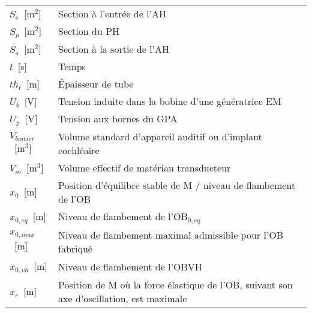 \begin{table}
{\begin{tabular}{l m{12cm}}
$S_e$~[m$^2$]       & Section à l'entrée de l'AH \\ 
$S_p$~[m$^2$]       & Section du PH \\ 
$S_s$~[m$^2$]       & Section à la sortie de l'AH \\  \cline{1-1} 
$t$~[s]            & Temps   \\
$th_t$~[m]      & Épaisseur de tube \\  \cline{1-1}
$U_b$~[V]            & Tension induite dans la bobine d'une génératrice EM     \\
$U_p$~[V]      & Tension aux bornes du GPA \\  \cline{1-1}
$V_{boitier}$~[m$^3$]   & Volume standard d'appareil auditif ou d'implant cochléaire\\
$V_m$~[m$^3$]      & Volume effectif de matériau transducteur   \\  \cline{1-1}
$x_0$~[m]            & Position d'équilibre stable de M / niveau de flambement de l'OB \\
$x_{0,eq}$~[m]       & Niveau de flambement de l'OB$_{0,eq}$                     \\
$x_{0,max}$~[m]      & Niveau de flambement maximal admissible pour l'OB fabriqué \\
$x_{0,vh}$~[m]       & Niveau de flambement de l'OBVH                    \\
$x_{c}$~[m]        & Position de M où la force élastique de l'OB, suivant son axe d'oscillation, est maximale \\
\end{tabular}}
\end{table}


